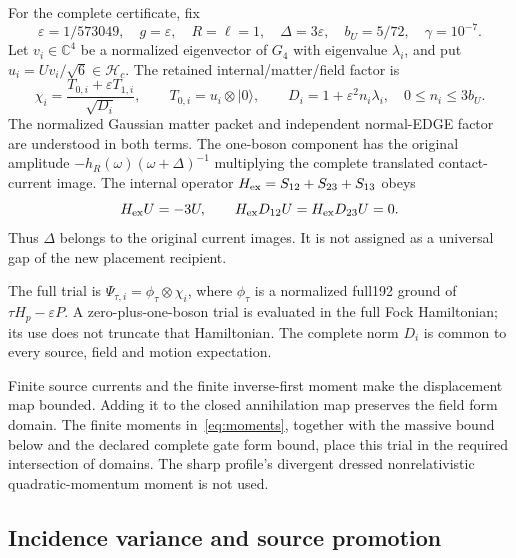 \documentclass[11pt]{article}
\theoremstyle{definition}
\newcommand{\HH}{\mathcal H}
\newcommand{\eps}{\varepsilon}
\begin{document}
For the complete certificate, fix
\begin{equation}\label{eq:fixed}
 \eps=1/573049,\quad g=\eps,\quad R=\ell=1,\quad
 \Delta=3\eps,\quad b_U=5/72,\quad\gamma=10^{-7}.
\end{equation}
Let $v_i\in\mathbb C^4$ be a normalized eigenvector of $G_4$ with eigenvalue $\lambda_i$, and put $u_i=Uv_i/\sqrt6\in\HH_c$. The retained internal/matter/field factor is
\begin{equation}\label{eq:trial}
 \chi_i=\frac{T_{0,i}+\eps T_{1,i}}{\sqrt{D_i}},\qquad
 T_{0,i}=u_i\otimes|0\rangle,\qquad
 D_i=1+\eps^2n_i\lambda_i,
 \quad 0\leq n_i\leq3b_U.
\end{equation}
The normalized Gaussian matter packet and independent normal-EDGE factor are understood in both terms. The one-boson component has the original amplitude $-h_R(\omega)(\omega+\Delta)^{-1}$ multiplying the complete translated contact-current image. The internal operator $H_{\rm ex}=S_{12}+S_{23}+S_{13}$ obeys
\begin{equation}\label{eq:gapimages}
 H_{\rm ex}U=-3U,\qquad H_{\rm ex}D_{12}U=H_{\rm ex}D_{23}U=0.
\end{equation}
Thus $\Delta$ belongs to the original current images. It is not assigned as a universal gap of the new placement recipient.

The full trial is $\Psi_{\tau,i}=\phi_\tau\otimes\chi_i$, where $\phi_\tau$ is a normalized full192 ground of $\tau H_p-\eps P$. A zero-plus-one-boson trial is evaluated in the full Fock Hamiltonian; its use does not truncate that Hamiltonian. The complete norm $D_i$ is common to every source, field and motion expectation.

Finite source currents and the finite inverse-first moment make the displacement map bounded. Adding it to the closed annihilation map preserves the field form domain. The finite moments in~\eqref{eq:moments}, together with the massive bound below and the declared complete gate form bound, place this trial in the required intersection of domains. The sharp profile's divergent dressed nonrelativistic quadratic-momentum moment is not used.

\subsection{Incidence variance and source promotion}
\end{document}
